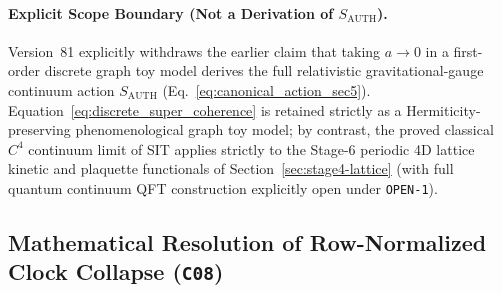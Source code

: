 \paragraph{Explicit Scope Boundary (Not a Derivation of $S_{\mathrm{AUTH}}$).}
Version~81 explicitly withdraws the earlier claim that taking $a \to 0$ in a first-order discrete graph toy model derives the full relativistic gravitational-gauge continuum action $S_{\mathrm{AUTH}}$ (Eq.~\eqref{eq:canonical_action_sec5}). Equation~\eqref{eq:discrete_super_coherence} is retained strictly as a Hermiticity-preserving phenomenological graph toy model; by contrast, the proved classical $C^4$ continuum limit of SIT applies strictly to the Stage-6 periodic 4D lattice kinetic and plaquette functionals of Section~\ref{sec:stage4-lattice} (with full quantum continuum QFT construction explicitly open under \texttt{OPEN-1}).

\subsection{Mathematical Resolution of Row-Normalized Clock Collapse (\texttt{C08})}
\label{sec:c08-network-resolution}

